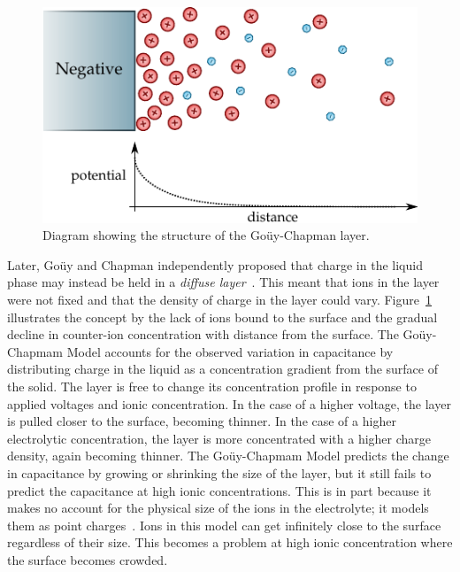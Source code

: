     \begin{figure}
      \begin{center}
        \includegraphics{content/introduction/graphics/model_guoyChapman}
      \end{center}
      \caption{Diagram showing the structure of the Goüy-Chapman layer.}
      \label{fig:doubleLayerModel_gouyChapman}
    \end{figure}
    Later, Goüy and Chapman independently proposed that charge in the liquid phase may instead be held in a \emph{diffuse layer}~\cite{Chapman1913}.
    This meant that ions in the layer were not fixed and that the density of charge in the layer could vary.
    Figure~\ref{fig:doubleLayerModel_gouyChapman} illustrates the concept by the lack of ions bound to the surface and the gradual decline in counter-ion concentration with distance from the surface.
    The Goüy-Chapmam Model accounts for the observed variation in capacitance by distributing charge in the liquid as a concentration gradient from the surface of the solid.
    The layer is free to change its concentration profile in response to applied voltages and ionic concentration.
    In the case of a higher voltage, the layer is pulled closer to the surface, becoming thinner.
    In the case of a higher electrolytic concentration, the layer is more concentrated with a higher charge density, again becoming thinner.
    The Goüy-Chapmam Model predicts the change in capacitance by growing or shrinking the size of the layer, but it still fails to predict the capacitance at high ionic concentrations.
    This is in part because it makes no account for the physical size of the ions in the electrolyte; it models them as point charges~\cite{Bard1980}.
    Ions in this model can get infinitely close to the surface regardless of their size.
    This becomes a problem at high ionic concentration where the surface becomes crowded.

